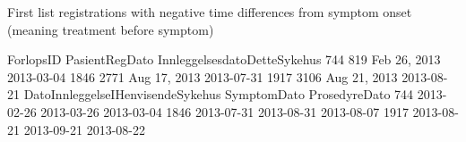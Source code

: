 \documentclass[a4paper]{report}
\begin{document}
First list registrations with negative time differences from symptom onset (meaning treatment before symptom)
\begin{Schunk}
\begin{Soutput}
     ForlopsID PasientRegDato InnleggelsesdatoDetteSykehus
744        819   Feb 26, 2013                   2013-03-04
1846      2771   Aug 17, 2013                   2013-07-31
1917      3106   Aug 21, 2013                   2013-08-21
     DatoInnleggelseIHenvisendeSykehus SymptomDato ProsedyreDato
744                         2013-02-26  2013-03-26    2013-03-04
1846                        2013-07-31  2013-08-31    2013-08-07
1917                        2013-08-21  2013-09-21    2013-08-22
\end{Soutput}
\end{Schunk}
\end{document}
